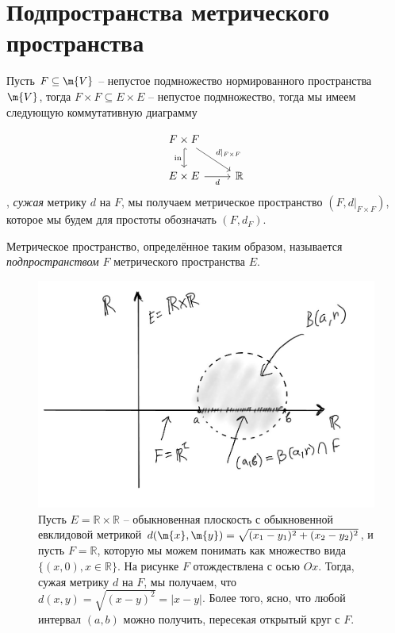 \section{Подпространства метрического пространства}

Пусть $F \subseteq \m{V}$ -- непустое подмножество нормированного пространства $\m{V}$, тогда $F \times F \subseteq E \times E$ -- непустое подмножество, тогда мы имеем следующую коммутативную диаграмму

\[
  \begin{tikzcd}
    F \times F \arrow[hook]{d}[left]{\mathrm{in}} \arrow{dr}{d|_{F \times F}} &  \\
    E \times E \arrow{r}[below]{d} & \mathbb{R}
  \end{tikzcd}
\]
\ie, \textit{сужая} метрику $d$ на $F$, мы получаем метрическое пространство $(F,d|_{F \times F})$, которое мы будем для простоты обозначать $(F, d_F)$.

\begin{definition}
    Метрическое пространство, определённое таким образом, называется \textit{подпространством} $F$ метрического пространства $E$.
\end{definition}

\begin{figure}[h!]
    \centering
    \includegraphics[scale = 0.4]{images/open_in_F.jpg}
    \caption{Пусть $E = \mathbb{R} \times \mathbb{R}$ -- обыкновенная плоскость с обыкновенной евклидовой метрикой $d(\m{x},\m{y}) = \sqrt{(x_1 - y_1)^2+ (x_2 - y_2)^2}$, и пусть $F = \mathbb{R}$, которую мы можем понимать как множество вида $\{(x,0), x\in \mathbb{R}\}$. На рисунке $F$ отождествлена с осью $Ox$. Тогда, сужая метрику $d$ на $F$, мы получаем, что $d(x,y) = \sqrt{(x-y)^2} = |x-y|$. Более того, ясно, что любой интервал $(a,b)$ можно получить, пересекая открытый круг с $F.$}
    \label{fig:enter-label}
\end{figure}



